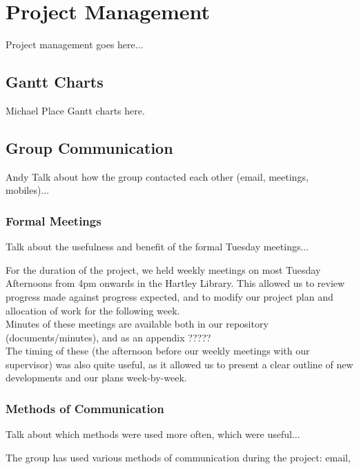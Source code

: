 \chapter{Project Management}
Project management goes here...

\section{Gantt Charts}
Michael
Place Gantt charts here.







\section{Group Communication}
Andy
Talk about how the group contacted each other (email, meetings, mobiles)...



\subsection{Formal Meetings}
Talk about the usefulness and benefit of the formal Tuesday meetings...

For the duration of the project, we held weekly meetings on most Tuesday 
Afternoons from 4pm onwards in the Hartley Library. This allowed us to 
review progress made against progress expected, and to modify our project 
plan and allocation of work for the following week.
\\
Minutes of these meetings are available both in our repository \cite{github} 
(documents/minutes), and as an appendix ?????
\\
The timing of these (the afternoon before our weekly meetings with our 
supervisor) was also quite useful, as it allowed us to present a clear outline 
of new developments and our plans week-by-week.

\subsection{Methods of Communication}
Talk about which methods were used more often, which were useful...

The group has used various methods of communication during the project: 
email, 

